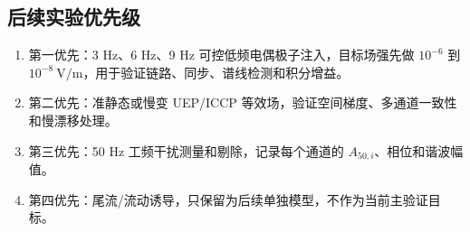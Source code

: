 \subsection{后续实验优先级}

\begin{enumerate}
    \item 第一优先：3 Hz、6 Hz、9 Hz 可控低频电偶极子注入，目标场强先做 $10^{-6}$ 到 $10^{-8}\ \mathrm{V/m}$，用于验证链路、同步、谱线检测和积分增益。
    \item 第二优先：准静态或慢变 UEP/ICCP 等效场，验证空间梯度、多通道一致性和慢漂移处理。
    \item 第三优先：50 Hz 工频干扰测量和剔除，记录每个通道的 $A_{50,i}$、相位和谐波幅值。
    \item 第四优先：尾流/流动诱导，只保留为后续单独模型，不作为当前主验证目标。
\end{enumerate}
